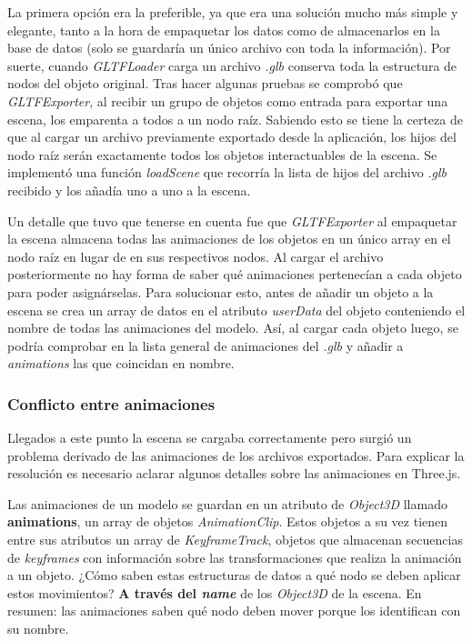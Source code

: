La primera opción era la preferible, ya que era una solución mucho más simple y elegante, tanto a la hora de empaquetar los datos como de almacenarlos en la base de datos (solo se guardaría un único archivo con toda la información). Por suerte, cuando \textit{GLTFLoader} carga un archivo \textit{.glb} conserva toda la estructura de nodos del objeto original. Tras hacer algunas pruebas se comprobó que \textit{GLTFExporter}, al recibir un grupo de objetos como entrada para exportar una escena, los emparenta a todos a un nodo raíz. Sabiendo esto se tiene la certeza de que al cargar un archivo previamente exportado desde la aplicación, los hijos del nodo raíz serán exactamente todos los objetos interactuables de la escena. Se implementó una función \textit{loadScene} que recorría la lista de hijos del archivo \textit{.glb} recibido y los añadía uno a uno a la escena.

Un detalle que tuvo que tenerse en cuenta fue que \textit{GLTFExporter} al empaquetar la escena almacena todas las animaciones de los objetos en un único array en el nodo raíz en lugar de en sus respectivos nodos. Al cargar el archivo posteriormente no hay forma de saber qué animaciones pertenecían a cada objeto para poder asignárselas. Para solucionar esto, antes de añadir un objeto a la escena se crea un array de datos en el atributo \textit{userData} del objeto conteniendo el nombre de todas las animaciones del modelo. Así, al cargar cada objeto luego, se podría comprobar en la lista general de animaciones del \textit{.glb} y añadir a \textit{animations} las que coincidan en nombre.

\subsubsection{Conflicto entre animaciones}

Llegados a este punto la escena se cargaba correctamente pero surgió un problema derivado de las animaciones de los archivos exportados. Para explicar la resolución es necesario aclarar algunos detalles sobre las animaciones en Three.js.

Las animaciones de un modelo se guardan en un atributo de \textit{Object3D} llamado \textbf{animations}, un array de objetos \textit{AnimationClip}. Estos objetos a su vez tienen entre sus atributos un array de \textit{KeyframeTrack}, objetos que almacenan secuencias de \textit{keyframes} con información sobre las transformaciones que realiza la animación a un objeto. ¿Cómo saben estas estructuras de datos a qué nodo se deben aplicar estos movimientos? \textbf{A través del \textit{name}} de los \textit{Object3D} de la escena. En resumen: las animaciones saben qué nodo deben mover porque los identifican con su nombre.

